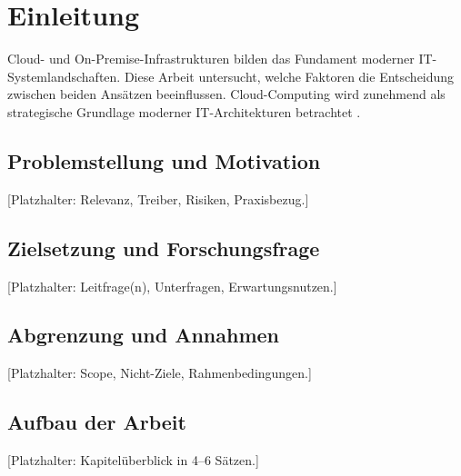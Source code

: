 \chapter{Einleitung}
Cloud- und On-Premise-Infrastrukturen bilden das Fundament moderner IT-Systemlandschaften.
Diese Arbeit untersucht, welche Faktoren die Entscheidung zwischen beiden Ansätzen beeinflussen.
Cloud-Computing wird zunehmend als strategische Grundlage moderner IT-Architekturen betrachtet \parencite{balzert2012}.

\section{Problemstellung und Motivation}
[Platzhalter: Relevanz, Treiber, Risiken, Praxisbezug.]

\section{Zielsetzung und Forschungsfrage}
[Platzhalter: Leitfrage(n), Unterfragen, Erwartungsnutzen.]

\section{Abgrenzung und Annahmen}
[Platzhalter: Scope, Nicht-Ziele, Rahmenbedingungen.]

\section{Aufbau der Arbeit}
[Platzhalter: Kapitelüberblick in 4–6 Sätzen.]
